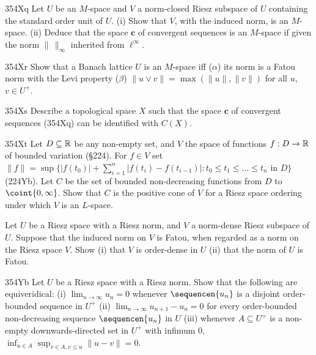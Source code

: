 {\sqheader 354Xq Let $U$ be an $M$-space and $V$ a norm-closed Riesz
subspace of $U$ containing the standard order unit of $U$.   (i) Show
that $V$, with the induced norm, is an $M$-space.   (ii) Deduce that the
space $\pmb{c}$ of convergent sequences is an $M$-space if given the
norm $\|\,\|_{\infty}$ inherited from $\ell^{\infty}$.

\spheader 354Xr Show that a Banach lattice $U$ is an $M$-space iff
($\alpha$) its norm is a Fatou norm with the Levi property ($\beta$)
$\|u\vee v\|=\max(\|u\|,\|v\|)$ for all $u$, $v\in U^+$.

\sqheader 354Xs Describe a topological space $X$ such that the space
$\pmb{c}$ of convergent sequences (354Xq) can be identified with $C(X)$.

\spheader 354Xt Let $D\subseteq\Bbb R$ be any non-empty set, and $V$ the
space of functions $f:D\to\Bbb R$ of bounded variation (\S224).   For
$f\in V$ set $\|f\|=\sup\{|f(t_0)|+\sum_{i=1}^n|f(t_i)-f(t_{i-1})|:
t_0\le t_1\le\ldots\le t_n$ in $D\}$ (224Yb).   Let $C$ be the set of
bounded non-decreasing functions from $D$ to $\coint{0,\infty}$.
Show that $C$ is the
positive cone of $V$ for a Riesz space ordering under which $V$ is an
$L$-space.

Let $U$ be a Riesz space with a Riesz norm, and $V$ a norm-dense Riesz
subspace of $U$.   Suppose that the induced norm on $V$ is Fatou, when
regarded as a norm on the Riesz space $V$.   Show (i) that $V$ is
order-dense in $U$ (ii) that the norm of $U$ is Fatou.   

\spheader 354Yb
Let $U$ be a Riesz space with a Riesz norm.   Show that the following
are equiveridical:  (i) $\lim_{n\to\infty}u_n=0$ whenever $\sequencen{u_n}$
is a disjoint order-bounded sequence in $U^+$ (ii)
$\lim_{n\to\infty}u_{n+1}-u_n=0$ for every order-bounded non-decreasing
sequence $\sequencen{u_n}$ in $U$ (iii) whenever $A\subseteq U^+$ is a
non-empty downwards-directed set in $U^+$ with infimum $0$,
$\inf_{u\in A}\sup_{v\in A,v\le u}\|u-v\|=0$.   

}
